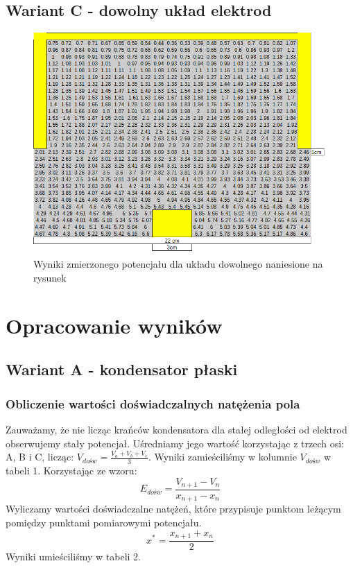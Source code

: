\documentclass{article}
\begin{document}
\clearpage

\subsection{Wariant C - dowolny układ elektrod}

\begin{figure}[h]
	\centering
	\includegraphics[scale=0.75]{pic2}
	\caption{Wyniki zmierzonego potencjału dla układu dowolnego naniesione na rysunek}
\end{figure}


\section{Opracowanie wyników}

\subsection{Wariant A - kondensator płaski}
\subsubsection{Obliczenie wartości doświadczalnych natężenia pola}
Zauważamy, że nie licząc krańców kondensatora dla stałej odległości od elektrod obserwujemy stały potencjał. Uśredniamy jego wartość korzystając z trzech osi: A, B i C, licząc: $V_{dośw} = \frac{V_{a}+V_{b}+V_{c}}{3}$. Wyniki zamieściliśmy w kolumnie $V_{dośw}$ w tabeli 1.
Korzystając ze wzoru:
\begin{equation}
	E_{dośw} = \frac{V_{n+1}-V_{n}}{x_{n+1}-x_{n}}
\end{equation}
Wyliczamy wartości doświadczalne natężeń, które przypisuje punktom leżącym pomiędzy punktami pomiarowymi potencjału.
\begin{equation}
	x^{*} = \frac{x_{n+1}+x_{n}}{2}
\end{equation}
Wyniki umieściliśmy w tabeli 2.
\end{document}
